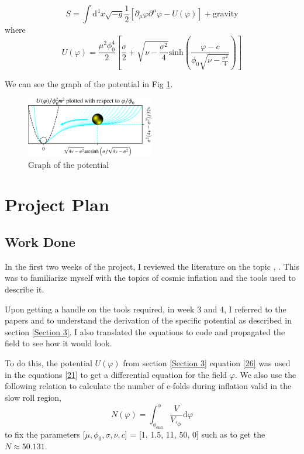 \documentclass[aps,prd,reprint,preprintnumbers,showpacs,floatfix,nofootinbib,superscript address]{revtex4-2}
\begin{document}
\begin{equation}
    S = \int \mathrm{d}^4 x \sqrt{-g} \frac{1}{2} \left[ \partial_\mu \varphi \partial^\mu \varphi - U(\varphi)   \right] + \text{gravity}
\end{equation}
where
\begin{equation} \label{26}
    U(\varphi) = \frac{\mu^2 \phi_{0}^{4}}{2} \left[ \frac{\sigma}{2} + \sqrt{\nu - \frac{\sigma^2}{4}} \text{sinh}\left( \frac{\varphi - c}{\phi_0 \sqrt{\nu - \frac{\sigma^2}{4}}} \right)  \right]
\end{equation}

We can see the graph of the potential in Fig \ref{Potential from Paper}.
\begin{figure}[h]
    \centering
    \includegraphics[width=0.5\textwidth]{Potential from Paper.png}
    \caption{Graph of the potential \cite{barker2024poincaregaugetheoryconformal}}
    \label{Potential from Paper}
\end{figure}


\section{Project Plan}

\subsection{Work Done}

In the first two weeks of the project, I reviewed the literature on the topic \cite{Mukhanov:2005sc}, \cite{baumann2012tasilecturesinflation}. This was to familiarize myself with the topics of cosmic inflation and the tools used to describe it. 

Upon getting a handle on the tools required, in week 3 and 4, I referred to the papers \cite{barker2024poincaregaugetheoryconformal} and \cite{Salvio_2022} to understand the derivation of the specific potential as described in section \ref{Section 3}. I also translated the equations to code and propagated the field to see how it would look.

To do this, the potential $U(\varphi)$ from section \ref{Section 3} equation \ref{26} was used in the equations \ref{21} to get a differential equation for the field $\varphi$. We also use the following relation to calculate the number of e-folds during inflation valid in the slow roll region,
\begin{equation}
    N(\varphi) = \int_{\phi_\text{end}}^{\phi} \frac{V}{V,_{\phi}} \mathrm{d}\varphi
\end{equation}
to fix the parameters [$\mu,\phi_0,\sigma,\nu,c$] = [1, 1.5, 11, 50, 0] such as to get the $N \approx 50.131$.
\end{document}
